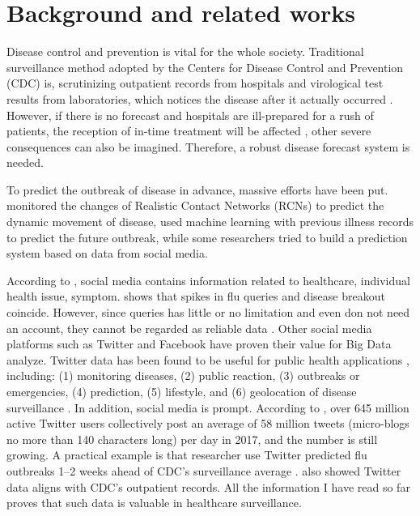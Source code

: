 \section{Background and related works}
Disease control and prevention is vital for the whole society. Traditional surveillance method adopted by the Centers for Disease Control and Prevention (CDC) is, scrutinizing outpatient records from hospitals and virological test results from laboratories, which notices the disease after it actually occurred \cite{schmidt2012trending}. However, if there is no forecast and hospitals are ill-prepared for a rush of patients, the reception of in-time treatment will be affected \cite{elkin2017network}, other severe consequences can also be imagined. Therefore, a robust disease forecast system is needed.

To predict the outbreak of disease in advance, massive efforts have been put. \cite{chen2017reality} monitored the changes of Realistic Contact Networks (RCNs) to predict the dynamic movement of disease, \cite{chen2017disease} used machine learning with previous illness records to predict the future outbreak, while some researchers tried to build a prediction system based on data from social media. 

According to \cite{lee2013real}, social media contains information related to healthcare, individual health issue, symptom. \cite{ginsberg2009detecting} shows that spikes in flu queries and disease breakout coincide. However, since queries has little or no limitation and even don not need an account, they cannot be regarded as reliable data \cite{schmidt2012trending}. Other social media platforms such as Twitter and Facebook have proven their value for Big Data analyze. Twitter data has been found to be useful for public health applications \cite{denecke2009valuable}, including: (1) monitoring diseases, (2) public reaction, (3) outbreaks or emergencies, (4) prediction, (5) lifestyle, and (6) geolocation of disease surveillance \cite{andreu2015big}. In addition, social media is prompt. According to \cite{elkin2017network}, over 645 million active Twitter users collectively post an average of 58 million tweets (micro-blogs no more than 140 characters long) per day in 2017, and the number is still growing. A practical example is that researcher use Twitter predicted flu outbreaks 1–2 weeks ahead of CDC’s surveillance average \cite{signorini2011use}. \cite{elkin2017network} also showed Twitter data aligns with CDC’s outpatient records. All the information I have read so far proves that such data is valuable in healthcare surveillance.  


